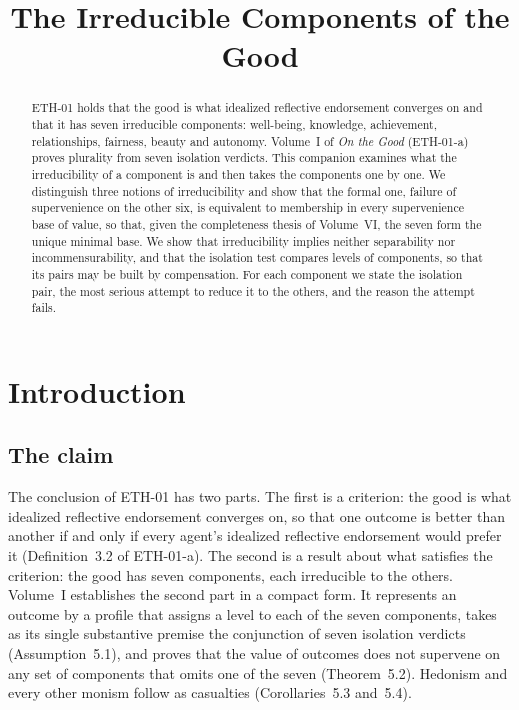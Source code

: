\documentclass{situationist-preprint}
\title{The Irreducible Components of the Good}
\begin{document}
\maketitle

\begin{abstract}
ETH-01 holds that the good is what idealized reflective endorsement converges on and that it has seven irreducible components: well-being, knowledge, achievement, relationships, fairness, beauty and autonomy. Volume~I of \emph{On the Good} (ETH-01-a) proves plurality from seven isolation verdicts. This companion examines what the irreducibility of a component is and then takes the components one by one. We distinguish three notions of irreducibility and show that the formal one, failure of supervenience on the other six, is equivalent to membership in every supervenience base of value, so that, given the completeness thesis of Volume~VI, the seven form the unique minimal base. We show that irreducibility implies neither separability nor incommensurability, and that the isolation test compares levels of components, so that its pairs may be built by compensation. For each component we state the isolation pair, the most serious attempt to reduce it to the others, and the reason the attempt fails.
\end{abstract}

\section{Introduction}\label{s:intro}

\subsection{The claim}

The conclusion of ETH-01 has two parts. The first is a criterion: the good is what idealized reflective endorsement converges on, so that one outcome is better than another if and only if every agent's idealized reflective endorsement would prefer it (Definition~3.2 of ETH-01-a). The second is a result about what satisfies the criterion: the good has seven components, each irreducible to the others. Volume~I establishes the second part in a compact form. It represents an outcome by a profile that assigns a level to each of the seven components, takes as its single substantive premise the conjunction of seven isolation verdicts (Assumption~5.1), and proves that the value of outcomes does not supervene on any set of components that omits one of the seven (Theorem~5.2). Hedonism and every other monism follow as casualties (Corollaries~5.3 and~5.4).
\end{document}
